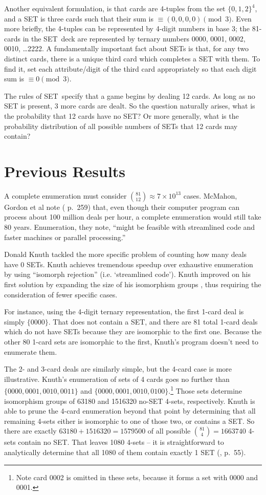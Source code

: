 \documentclass[10pt]{amsart}
\newcommand{\SETb}{SET\texttrademark\ } %
\begin{document}
Another equivalent formulation, is that cards are 4-tuples from the set
$\{0,1,2\}^4$, and a SET is three cards such that their sum is $\equiv (0,0,0,0)
\pmod 3$. Even more briefly, the 4-tuples can be represented by 4-digit numbers
in base 3; the 81-cards in the \SETb deck are represented by ternary numbers
0000, 0001, 0002, 0010, \ldots 2222. A fundamentally important fact about SETs
is that, for any two distinct cards, there is a unique third card which
completes a SET with them. To find it, set each attribute/digit of the third
card appropriately so that each digit sum is $\equiv 0 \pmod 3$.

The rules of \SETb specify that a game begins by dealing 12 cards. As long as no
SET is present, 3 more cards are dealt. So the question naturally arises, what
is the probability that 12 cards have no SET? Or more generally, what is the
probability distribution of all possible numbers of SETs that 12 cards may
contain?

\section{Previous Results}
A complete enumeration must consider $\binom{81}{12} \approx 7\times 10^{13}$
cases. McMahon, Gordon et al note (\cite{JOS} p.~259) that, even though their
computer program can process about 100 million deals per hour, a complete
enumeration would still take 80 years. Enumeration, they note, ``might be
feasible with streamlined code and faster machines or parallel processing.''

Donald Knuth tackled the more specific problem of counting how many deals have 0
SETs. Knuth achieves tremendous speedup over exhaustive enumeration by using
``isomorph rejection'' (i.e. `streamlined code'). Knuth improved on his first
solution \cite{SETSET} by expanding the size of his isomorphism groups
\cite{SETSET-ALL}, thus requiring the consideration of fewer specific cases.

For instance, using the 4-digit ternary representation, the first 1-card deal is
simply $\{0000\}$. That does not contain a SET, and there are 81 total 1-card
deals which do not have SETs because they are isomorphic to the first
one. Because the other 80 1-card sets are isomorphic to the first, Knuth's
program doesn't need to enumerate them.

The 2- and 3-card deals are similarly simple, but the 4-card case is more
illustrative. Knuth's enumeration of sets of 4 cards goes no further than
$\{0000, 0001, 0010, 0011\}$ and $\{0000, 0001, 0010, 0100\}$.\footnote{Note
  card 0002 is omitted in these sets, because it forms a set with 0000 and
  0001.}  Those sets determine isomorphism groups of 63180 and 1516320 no-SET
4-sets, respectively. Knuth is able to prune the 4-card enumeration beyond that
point by determining that all remaining 4-sets either is isomorphic to one of
those two, or contains a SET. So there are exactly $63180+1516320=1579500$ of
all possible $\binom{81}{4}=1663740$ 4-sets contain no SET. That leaves 1080
4-sets -- it is straightforward to analytically determine that all 1080 of them
contain exactly 1 SET (\cite{JOS}, p.~55).
\end{document}
